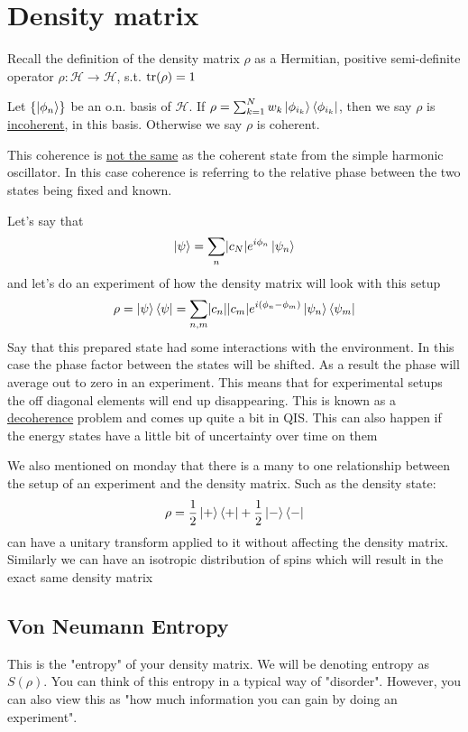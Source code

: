 \section{Density matrix}
Recall the definition of the density matrix $\rho$ as a 
Hermitian, positive semi-definite operator $\rho: \mathcal{H} \rightarrow \mathcal{H}$,
s.t. $\operatorname{tr}(\rho) = 1$

\begin{definition}
\label{incoherentDM}
Let $\left\{\Ket{\phi_n}\right\}$ be an o.n. basis of $\mathcal{H}$.
If $\rho = \sum_{k=1}^{N} w_k \Ket{\phi_{i_k}} \Bra{\phi_{i_k}}$, then
we say $\rho$ is \underline{incoherent}, in this basis. Otherwise
we say $\rho$ is coherent.
\end{definition}

This coherence is \underline{not the same} as the coherent state 
from the simple harmonic oscillator. In this case coherence
is referring to the relative phase between the two states being fixed and known.

Let's say that
$$
\Ket{\psi} = \sum_n \abs*{c_N} e^{i \phi_n} \Ket{\psi_n}
$$
and let's do an experiment of how the density matrix will look with this
setup
$$
    \rho = \Ket{\psi} \Bra{\psi} = \sum_{n,m}
        \abs*{c_n}\abs*{c_m} e^{i (\phi_n - \phi_m)}
        \Ket{\psi_n} \Bra{\psi_m}
$$
Say that this prepared state had some interactions with the environment.
In this case the phase factor between the states will be shifted. As a result
the phase will average out to zero in an experiment. This means that for experimental
setups the off diagonal elements will end up disappearing. This is known as a
\underline{decoherence} problem and comes up quite a bit in QIS. This can
also happen if the energy states have a little bit of uncertainty over time on them

We also mentioned on monday that there is a many to one relationship between the setup
of an experiment and the density matrix. Such as
the density state:
$$
    \rho = \frac{1}{2} \Ket{+}\Bra{+} + \frac{1}{2} \Ket{-}\Bra{-}
$$
can have a unitary transform applied to it without affecting the density matrix.
Similarly we can have an isotropic distribution of spins which will
result in the exact same density matrix

\subsection{Von Neumann Entropy}
This is the "entropy" of your density matrix. We will be denoting
entropy as $S(\rho)$. You can think of this entropy in a typical
way of "disorder". However, you can also view this
as "how much information you can gain by doing an experiment".

